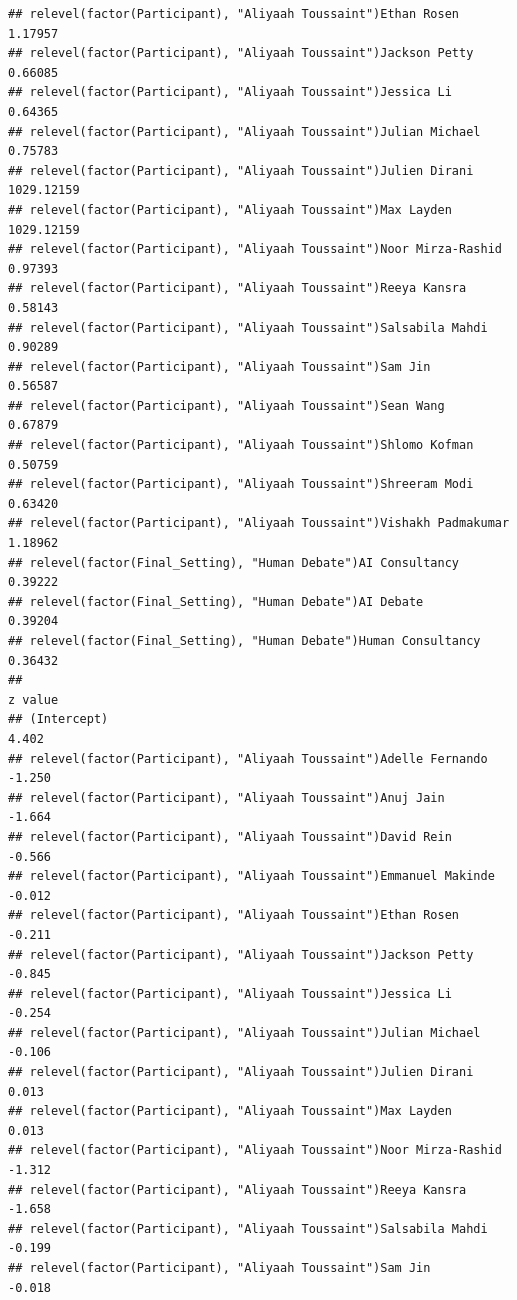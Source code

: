 \documentclass[
]{article}
\begin{document}
\begin{verbatim}
## relevel(factor(Participant), "Aliyaah Toussaint")Ethan Rosen           1.17957
## relevel(factor(Participant), "Aliyaah Toussaint")Jackson Petty         0.66085
## relevel(factor(Participant), "Aliyaah Toussaint")Jessica Li            0.64365
## relevel(factor(Participant), "Aliyaah Toussaint")Julian Michael        0.75783
## relevel(factor(Participant), "Aliyaah Toussaint")Julien Dirani      1029.12159
## relevel(factor(Participant), "Aliyaah Toussaint")Max Layden         1029.12159
## relevel(factor(Participant), "Aliyaah Toussaint")Noor Mirza-Rashid     0.97393
## relevel(factor(Participant), "Aliyaah Toussaint")Reeya Kansra          0.58143
## relevel(factor(Participant), "Aliyaah Toussaint")Salsabila Mahdi       0.90289
## relevel(factor(Participant), "Aliyaah Toussaint")Sam Jin               0.56587
## relevel(factor(Participant), "Aliyaah Toussaint")Sean Wang             0.67879
## relevel(factor(Participant), "Aliyaah Toussaint")Shlomo Kofman         0.50759
## relevel(factor(Participant), "Aliyaah Toussaint")Shreeram Modi         0.63420
## relevel(factor(Participant), "Aliyaah Toussaint")Vishakh Padmakumar    1.18962
## relevel(factor(Final_Setting), "Human Debate")AI Consultancy           0.39222
## relevel(factor(Final_Setting), "Human Debate")AI Debate                0.39204
## relevel(factor(Final_Setting), "Human Debate")Human Consultancy        0.36432
##                                                                     z value
## (Intercept)                                                           4.402
## relevel(factor(Participant), "Aliyaah Toussaint")Adelle Fernando     -1.250
## relevel(factor(Participant), "Aliyaah Toussaint")Anuj Jain           -1.664
## relevel(factor(Participant), "Aliyaah Toussaint")David Rein          -0.566
## relevel(factor(Participant), "Aliyaah Toussaint")Emmanuel Makinde    -0.012
## relevel(factor(Participant), "Aliyaah Toussaint")Ethan Rosen         -0.211
## relevel(factor(Participant), "Aliyaah Toussaint")Jackson Petty       -0.845
## relevel(factor(Participant), "Aliyaah Toussaint")Jessica Li          -0.254
## relevel(factor(Participant), "Aliyaah Toussaint")Julian Michael      -0.106
## relevel(factor(Participant), "Aliyaah Toussaint")Julien Dirani        0.013
## relevel(factor(Participant), "Aliyaah Toussaint")Max Layden           0.013
## relevel(factor(Participant), "Aliyaah Toussaint")Noor Mirza-Rashid   -1.312
## relevel(factor(Participant), "Aliyaah Toussaint")Reeya Kansra        -1.658
## relevel(factor(Participant), "Aliyaah Toussaint")Salsabila Mahdi     -0.199
## relevel(factor(Participant), "Aliyaah Toussaint")Sam Jin             -0.018

\end{verbatim}
\end{document}
